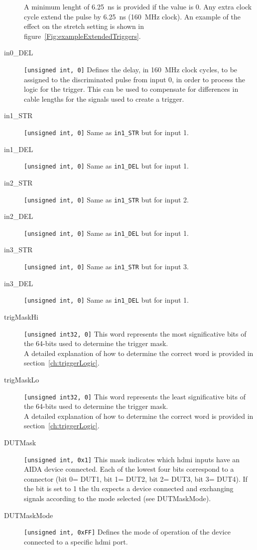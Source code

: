 \begin{description}
      A minimum lenght of 6.25~ns is provided if the value is 0. Any extra clock cycle extend the pulse by 6.25~ns (160~MHz clock). An example of the effect on the stretch setting is shown in figure~\ref{Fig:exampleExtendedTriggers}.
  \item[in0\_DEL] \verb|[unsigned int, 0]| Defines the delay, in 160~MHz clock cycles, to be assigned to the discriminated pulse from input 0, in order to process the logic for the trigger. This can be used to compensate for differences in cable lengths for the signals used to create a trigger.
  \item[in1\_STR] \verb|[unsigned int, 0]| Same as \texttt{in1\_STR} but for input 1.
  \item[in1\_DEL] \verb|[unsigned int, 0]| Same as \texttt{in1\_DEL} but for input 1.
  \item[in2\_STR] \verb|[unsigned int, 0]| Same as \texttt{in1\_STR} but for input 2.
  \item[in2\_DEL] \verb|[unsigned int, 0]| Same as \texttt{in1\_DEL} but for input 1.
  \item[in3\_STR] \verb|[unsigned int, 0]| Same as \texttt{in1\_STR} but for input 3.
  \item[in3\_DEL] \verb|[unsigned int, 0]| Same as \texttt{in1\_DEL} but for input 1.
  \item[trigMaskHi] \verb|[unsigned int32, 0]| This word represents the most significative bits of the 64-bits used to determine the trigger mask.\\
        A detailed explanation of how to determine the correct word is provided in section~\ref{ch:triggerLogic}.
  \item[trigMaskLo] \verb|[unsigned int32, 0]| This word represents the least significative bits of the 64-bits used to determine the trigger mask.\\
        A detailed explanation of how to determine the correct word is provided in section~\ref{ch:triggerLogic}.
  \item[DUTMask]  \verb|[unsigned int, 0x1]| This mask indicates which \gls{hdmi} inputs have an AIDA device connected. Each of the lowest four bits correspond to a connector (bit 0= DUT1, bit 1= DUT2, bit 2= DUT3, bit 3= DUT4). If the bit is set to 1 the \gls{tlu} expects a device connected and exchanging signals according to the mode selected (see DUTMaskMode).
  \item[DUTMaskMode]  \verb|[unsigned int, 0xFF]| Defines the mode of operation of the device connected to a specific \gls{hdmi} port.\\

\end{description}
